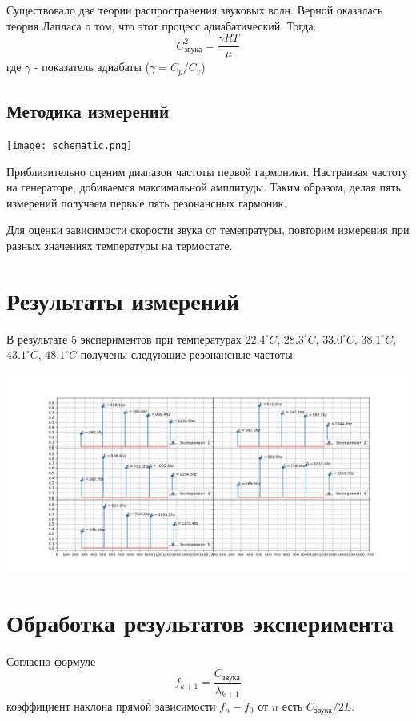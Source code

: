 \documentclass{article}
\begin{document}
Существовало две теории распространения звуковых волн. Верной оказалась теория Лапласа о том, что этот процесс адиабатический. 
Тогда:
\begin{equation}\label{speedOfSound}
C_{\text{звука}}^2 = \frac{\gamma R T}{\mu}
\end{equation}
где $\gamma$ - показатель адиабаты ($\gamma = C_{p}/C_{v}$)
\subsection{Методика измерений}
\begin{center}
    \texttt{[image: schematic.png]}
\end{center}

Приблизительно оценим диапазон частоты первой гармоники. Настраивая частоту на генераторе, добиваемся максимальной амплитуды. Таким образом, делая пять измерений получаем первые пять резонансных гармоник.

Для оценки зависимости скорости звука от темепратуры, повторим измерения при разных значениях температуры на термостате.
\section{Результаты измерений}

В результате 5 экспериментов при температурах $22.4^\circ C$, $28.3^\circ C$,
$33.0^\circ C$, $38.1^\circ C$, $43.1^\circ C$, $48.1^\circ C$ получены следующие резонансные частоты:
\begin{center}
    \includegraphics[scale = 0.3]{expResults.png}
\end{center}
\section{Обработка результатов эксперимента}

Согласно формуле 
\begin{equation}
    f_{k+1} = \frac{C_{\text{звука}}}{\lambda_{k+1}}
\end{equation}
коэффициент наклона прямой зависимости $f_{n}-f_{0}$ от $n$ есть $C_{\text{звука}}/2L$.
\end{document}
